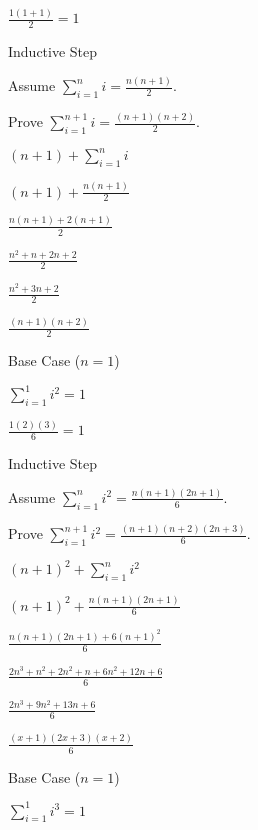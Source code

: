 \documentclass{exam}
\begin{document}
\begin{questions}
\begin{subparts}
\begin{center}
\(\frac{1(1+1)}{2} = 1\)
\vspace{5px}

Inductive Step

Assume \( \sum_{i=1}^{n} i = \frac{n(n+1)}{2} \). 

Prove \( \sum_{i=1}^{n+1} i = \frac{(n+1)(n+2)}{2} \).

\( (n+1) + \sum_{i=1}^{n} i \)

\( (n+1) + \frac{n(n+1)}{2} \)

\(  \frac{n(n+1) + 2(n+1)}{2} \)

\(  \frac{n^2 + n + 2n + 2}{2} \)

\(  \frac{n^2 + 3n + 2}{2} \)

\(  \frac{(n+1)(n+2)}{2} \)

\end{center}

\newpage


\begin{center}

Base Case (\(n = 1\))

\(\sum_{i=1}^{1} i^2 = 1\)

\(\frac{1(2)(3)}{6} = 1\)
\vspace{5px}

Inductive Step

Assume \( \sum_{i=1}^{n} i^2 = \frac{n(n+1)(2n+1)}{6} \). 

Prove \(  \sum_{i=1}^{n+1} i^2 = \frac{(n+1)(n+2)(2n+3)}{6} \).

\( (n+1)^2 + \sum_{i=1}^{n} i^2 \)

\( (n+1)^2 + \frac{n(n+1)(2n+1)}{6} \)

\(  \frac{n(n+1)(2n+1) + 6(n+1)^2}{6} \)

\(  \frac{2n^3 + n^2 + 2n^2 + n + 6n^2 + 12n + 6}{6} \)

\(  \frac{2n^3 + 9n^2 + 13n + 6}{6} \)

\(  \frac{(x+1)(2x+3)(x+2)}{6} \)

\end{center}


\begin{center}

Base Case (\(n = 1\))

\(\sum_{i=1}^{1} i^3 = 1\)


\end{center}
\end{subparts}
\end{questions}
\end{document}
